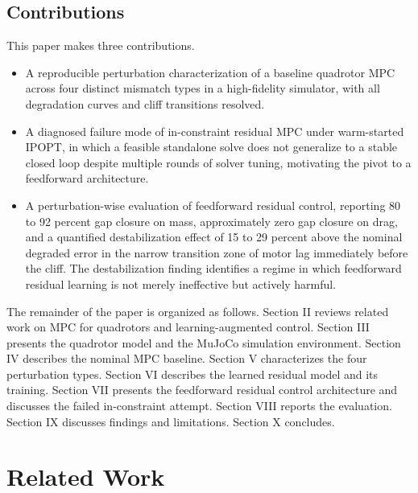 \documentclass[conference]{IEEEtran}
\begin{document}
\subsection{Contributions}
This paper makes three contributions.
\begin{itemize}
\item A reproducible perturbation characterization of a baseline quadrotor MPC across four distinct mismatch types in a high-fidelity simulator, with all degradation curves and cliff transitions resolved.
\item A diagnosed failure mode of in-constraint residual MPC under warm-started IPOPT, in which a feasible standalone solve does not generalize to a stable closed loop despite multiple rounds of solver tuning, motivating the pivot to a feedforward architecture.
\item A perturbation-wise evaluation of feedforward residual control, reporting 80 to 92 percent gap closure on mass, approximately zero gap closure on drag, and a quantified destabilization effect of 15 to 29 percent above the nominal degraded error in the narrow transition zone of motor lag immediately before the cliff. The destabilization finding identifies a regime in which feedforward residual learning is not merely ineffective but actively harmful.
\end{itemize}
The remainder of the paper is organized as follows. Section II reviews related work on MPC for quadrotors and learning-augmented control. Section III presents the quadrotor model and the MuJoCo simulation environment. Section IV describes the nominal MPC baseline. Section V characterizes the four perturbation types. Section VI describes the learned residual model and its training. Section VII presents the feedforward residual control architecture and discusses the failed in-constraint attempt. Section VIII reports the evaluation. Section IX discusses findings and limitations. Section X concludes.

\section{Related Work}
\end{document}
